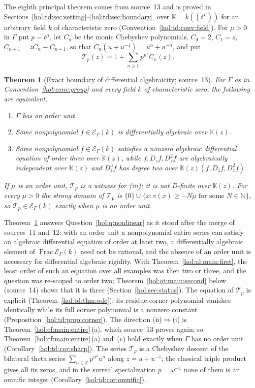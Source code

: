 \documentclass[11pt]{article}
\numberwithin{equation}{section}
\newtheorem{maintheorem}{Theorem}
\theoremstyle{definition}
\theoremstyle{remark}
\newcommand{\N}{\mathbb N}
\newcommand{\Z}{\mathbb Z}
\newcommand{\KK}{\mathbb K}
\newcommand{\EK}{\mathcal E_\Gamma(k)}
\newcommand{\FE}{\operatorname{Frac}\EK}
\begin{document}
The eighth principal theorem comes from source~13 and is proved in
Sections~\ref{hol:td:sec:setting}--\ref{hol:td:sec:boundary}, over
$\KK=k((t^\Gamma))$ for an arbitrary field $k$ of characteristic zero
(Convention~\ref{hol:td:conv:field}). For $\mu>0$ in $\Gamma$ put $p=t^\mu$,
let $C_n$ be the monic Chebyshev polynomials, $C_0=2$, $C_1=z$,
$C_{n+1}=zC_n-C_{n-1}$, so that $C_n(u+u^{-1})=u^n+u^{-n}$, and put
\begin{equation}\label{hol:td:eq:series}
 \mathcal T_p(z)=1+\sum_{n\ge1}p^{n^2}C_n(z).
\end{equation}

\begin{maintheorem}[Exact boundary of differential algebraicity; source~13]
\label{hol:td:main:boundary}
For $\Gamma$ as in Convention~\ref{hol:conv:group} and every field $k$ of
characteristic zero, the following are equivalent.
\begin{enumerate}[label=\textup{(\roman*)}]
\item $\Gamma$ has an order unit.
\item Some nonpolynomial $f\in\EK$ is differentially algebraic over $\KK(z)$.
\item Some nonpolynomial $f\in\EK$ satisfies a nonzero algebraic differential
equation of order three over $\KK(z)$, while $f,D_zf,D_z^2f$ are algebraically
independent over $\KK(z)$ and $D_z^3f$ has degree two over
$\KK(z)(f,D_zf,D_z^2f)$.
\end{enumerate}
If $\mu$ is an order unit, $\mathcal T_p$ is a witness for \textup{(iii)}; it
is not D-finite over $\KK(z)$. For every $\mu>0$ the strong domain of
$\mathcal T_p$ is $\{0\}\cup\{x:v(x)\ge-N\mu\text{ for some }N\in\N\}$, so
$\mathcal T_p\in\EK$ exactly when $\mu$ is an order unit.
\end{maintheorem}

Theorem~\ref{hol:td:main:boundary} answers Question~\ref{hol:q:nonlinear} as it
stood after the merge of sources~11 and~12: with an order unit a nonpolynomial
entire series can satisfy an algebraic differential equation of order at
least two, a differentially algebraic element of $\FE$ need not be rational,
and the absence of an order unit is necessary for differential algebraic
rigidity. With Theorem~\ref{hol:nl:main:first}, the least order of such an
equation over all examples was then two or three, and the question was
re-scoped to order two; Theorem~\ref{hol:ot:main:second} below (source~14)
shows that it is three (Section~\ref{hol:sec:status}). The equation of
$\mathcal T_p$ is
explicit (Theorem~\ref{hol:td:thm:ode}); its residue corner polynomial vanishes
identically while its full corner polynomial is a nonzero constant
(Proposition~\ref{hol:td:prop:corner}). The direction (ii)$\Rightarrow$(i) is
Theorem~\ref{hol:cf:main:entire}\,(a), which source~13 proves again; so
Theorem~\ref{hol:cf:main:entire}\,(a) and~(c) hold exactly when $\Gamma$ has no
order unit (Corollary~\ref{hol:td:cor:sharp}). The series $\mathcal T_p$ is a
Chebyshev descent of the bilateral theta series $\sum_{n\in\Z}p^{n^2}u^n$ along
$z=u+u^{-1}$; the classical triple product gives all its zeros, and in the
surreal specialization $p=\omega^{-1}$ none of them is an omnific integer
(Corollary~\ref{hol:td:cor:omnific}).
\end{document}
